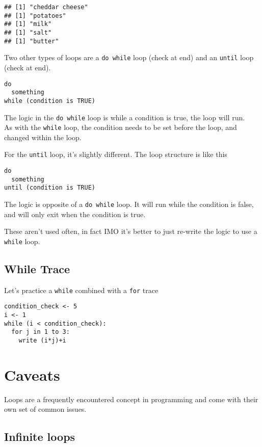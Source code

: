 \documentclass[
]{book}
\begin{document}
\begin{verbatim}
## [1] "cheddar cheese"
## [1] "potatoes"
## [1] "milk"
## [1] "salt"
## [1] "butter"
\end{verbatim}

Two other types of loops are a \texttt{do\ while} loop (check at end) and an \texttt{until} loop (check at end).

\begin{verbatim}
do
  something
while (condition is TRUE)
\end{verbatim}

The logic in the \texttt{do\ while} loop is while a condition is true, the loop will run.\\
As with the \texttt{while} loop, the condition needs to be set before the loop, and changed within the loop.

For the \texttt{until} loop, it's slightly different. The loop structure is like this

\begin{verbatim}
do
  something
until (condition is TRUE)
\end{verbatim}

The logic is opposite of a \texttt{do\ while} loop. It will run while the condition is false, and will only exit when the condition is true.

These aren't used often, in fact IMO it's better to just re-write the logic to use a \texttt{while} loop.

\subsection{While Trace}\label{while-trace}

Let's practice a \texttt{while} combined with a \texttt{for} trace

\begin{verbatim}
condition_check <- 5
i <- 1
while (i < condition_check):
  for j in 1 to 3:
    write (i*j)+i
\end{verbatim}

\section{Caveats}\label{caveats}

Loops are a frequently encountered concept in programming and come with their own set of common issues.

\subsection{Infinite loops}\label{infinite-loops}
\end{document}
